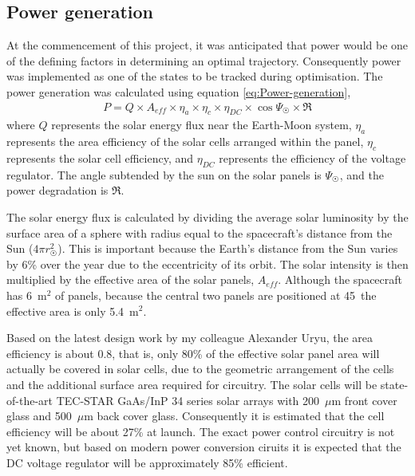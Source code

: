 \subsection{Power generation} \label{sub:Power-generation}

At the commencement of this project, it was anticipated that power would be one of the defining factors in determining an optimal trajectory. Consequently power was implemented as one of the states to be tracked during optimisation. The power generation was calculated using equation \eqref{eq:Power-generation},
\begin{gather} \label{eq:Power-generation}
P = Q\times A_{eff}\times\eta_a\times\eta_c\times\eta_{DC}\times\cos\Psi_\Sun\times\mathfrak{R}
\end{gather}
where $Q$ represents the solar energy flux near the Earth-Moon system, $\eta_a$ represents the area efficiency of the solar cells arranged within the panel, $\eta_c$ represents the solar cell efficiency, and $\eta_{DC}$ represents the efficiency of the voltage regulator. The angle subtended by the sun on the solar panels is $\Psi_\Sun$, and the power degradation is $\mathfrak{R}$.

The solar energy flux is calculated by dividing the average solar luminosity \parencite[$3.846\times10^{26}$ W,][]{Montenbruck2000} by the surface area of a sphere with radius equal to the spacecraft's distance from the Sun ($4\pi r_\Sun^2$). This is important because the Earth's distance from the Sun varies by 6\% over the year \parencite{Montenbruck2000} due to the eccentricity of its orbit. The solar intensity is then multiplied by the effective area of the solar panels, $A_{eff}$. Although the spacecraft has 6~m$^2$ of panels, because the central two panels are positioned at 45\degrees\ the effective area is only 5.4~m$^2$.

Based on the latest design work by my colleague Alexander Uryu, the area efficiency is about 0.8, that is, only 80\% of the effective solar panel area will actually be covered in solar cells, due to the geometric arrangement of the cells and the additional surface area required for circuitry. The solar cells will be state-of-the-art TEC-STAR GaAs/InP 34 series solar arrays with 200~$\mu$m front cover glass and 500~$\mu$m back cover glass. Consequently it is estimated that the cell efficiency will be about 27\% at launch. The exact power control circuitry is not yet known, but based on modern power conversion ciruits it is expected that the DC voltage regulator will be approximately 85\% efficient. 

